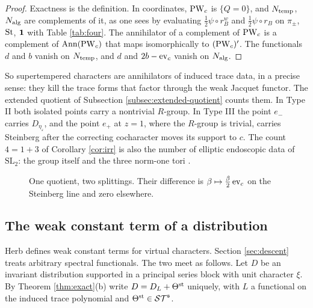 \begin{proof}
Exactness is the definition. In coordinates, $\operatorname{PW}_c$ is $\{Q=0\}$, and $N_{\rm temp}$, $N_{\rm alg}$ are complements of it, as one sees by evaluating $\tfrac12\psi\circ r_B^w$ and $\tfrac12\psi\circ r_B$ on $\pi_\pm$, $\operatorname{St}$, $\mathbf 1$ with Table \ref{tab:four}. The annihilator of a complement of $\operatorname{PW}_c$ is a complement of $\operatorname{Ann}(\operatorname{PW}_c)$ that maps isomorphically to $(\operatorname{PW}_c)'$. The functionals $d$ and $b$ vanish on $N_{\rm temp}$, and $d$ and $2b-\operatorname{ev}_c$ vanish on $N_{\rm alg}$.
\end{proof}
So supertempered characters are annihilators of induced trace data, in a precise sense: they kill the trace forms that factor through the weak Jacquet functor. The extended quotient of Subsection \ref{subsec:extended-quotient} counts them. In Type II both isolated points carry a nontrivial $R$-group. In Type III the point $e_-$ carries $D_{\eta_\varepsilon}$, and the point $e_+$ at $z=1$, where the $R$-group is trivial, carries Steinberg after the correcting cocharacter moves its support to $c$. The count $4=1+3$ of Corollary \ref{cor:irr} is also the number of elliptic endoscopic data of $\mathrm{SL}_2$: the group itself and the three norm-one tori \cite{LL79}.

\begin{figure}[htbp]\centering
{}
\caption{One quotient, two splittings. Their difference is $\beta\mapsto\frac\beta2\operatorname{ev}_c$ on the Steinberg line and zero elsewhere.}\label{fig:splittings}
\end{figure}

\subsection{The weak constant term of a distribution}\label{sub:wct}
Herb defines weak constant terms for virtual characters. Section \ref{sec:descent} treats arbitrary spectral functionals. The two meet as follows. Let $D$ be an invariant distribution supported in a principal series block with unit character $\xi$. By Theorem \ref{thm:exact}(b) write $D=D_L+\Theta^{\rm st}$ uniquely, with $L$ a functional on the induced trace polynomial and $\Theta^{\rm st}\in\mathcal{ST}^{\mathfrak s}$.

